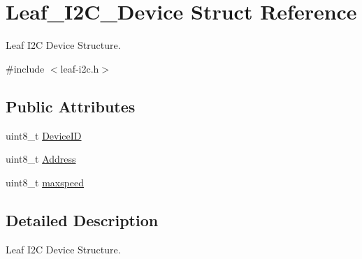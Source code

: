 \hypertarget{structLeaf__I2C__Device}{\section{Leaf\-\_\-\-I2\-C\-\_\-\-Device Struct Reference}
\label{structLeaf__I2C__Device}
}


Leaf I2\-C Device Structure.  




{\ttfamily \#include $<$leaf-\/i2c.\-h$>$}

\subsection*{Public Attributes}
\begin{DoxyCompactItemize}
\item 
uint8\-\_\-t \hyperlink{structLeaf__I2C__Device_a0bca2bbd3747ab6745d5f9c42cee2ae5}{Device\-I\-D}
\item 
uint8\-\_\-t \hyperlink{structLeaf__I2C__Device_ac633599d8088a5ec3262087ca2de76e2}{Address}
\item 
uint8\-\_\-t \hyperlink{structLeaf__I2C__Device_ae821fbd95dcf56b25e65e31d9f543c03}{maxspeed}
\end{DoxyCompactItemize}


\subsection{Detailed Description}
Leaf I2\-C Device Structure. 

